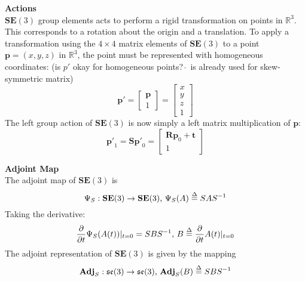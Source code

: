 		\textbf{Actions}\\
		$\mathbf{SE}(3)$ group elements acts to perform a rigid transformation on points in $\mathbb{R}^3$. This corresponds to a rotation about the origin and a translation.
		To apply a transformation using the $4 \times 4$ matrix elements of $\mathbf{SE}(3)$ to a point $\textbf{p} = (x,y,z) $ in $\mathbb{R}^3$, the point must be represented with homogeneous coordinates: (is $p'$ okay for homogeneous points? $\hat{\:}$ is already used for skew-symmetric matrix)
		\begin{equation}
			\mathbf{p'} = 
			\begin{bmatrix}
				  \mathbf{p} \\
				  1	
			\end{bmatrix} =
			\begin{bmatrix}
				  x	\\
				  y	\\
				  z	\\
				  1	
			\end{bmatrix}
		\end{equation}
		The left group action of $\mathbf{SE}(3)$ is now simply a left matrix multiplication of $\mathbf{p}$:
		\begin{equation}
			\mathbf{p'}_1 = \mathbf{S}\mathbf{p'}_0 = 
			\begin{bmatrix}
				\mathbf{R}\mathbf{p}_0 + \mathbf{t}\\
				1	
			\end{bmatrix}
		\end{equation}
				
		\textbf{Adjoint Map}\\
		The adjoint map of $\mathbf{SE}(3)$ is
		\begin{equation}
			\Psi_S: \mathbf{SE}(3) \rightarrow \mathbf{SE}(3) \textnormal{, }
			\Psi_S(A) \stackrel{\Delta}{=} SAS^{-1}
		\end{equation}
		Taking the derivative:
		\begin{equation}
			\frac{\partial}{\partial t} \Psi_S(A(t))|_{t=0} = SBS^{-1} \textnormal{, }
			B \stackrel{\Delta}{=} 	\frac{\partial}{\partial t}A(t)|_{t=0}
		\end{equation}
		The adjoint	representation of $\mathbf{SE}(3)$ is given by the mapping
		\begin{equation}
			\textbf{Adj}_S: \mathfrak{se}(3) \rightarrow \mathfrak{se}(3) \textnormal{, }
			\textbf{Adj}_S(B) \stackrel{\Delta}{=} SBS^{-1}
		\end{equation}
		
